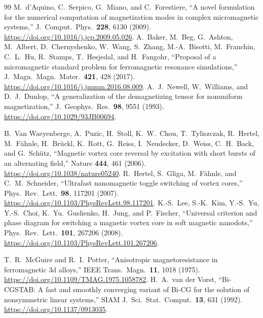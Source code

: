 \documentclass{article}      %
\begin{document}
\begin{thebibliography}{99}
 M.\ d'Aquino, C.\ Serpico, G.\ Miano, and C.\ Forestiere, ``A novel
  formulation for the numerical computation of magnetization modes in complex micromagnetic
  systems,'' J.\ Comput.\ Phys.\ \textbf{228}, 6130 (2009).
  \url{https://doi.org/10.1016/j.jcp.2009.05.026}.
 A.\ Baker, M.\ Beg, G.\ Ashton, M.\ Albert, D.\ Chernyshenko, W.\ Wang,
  S.\ Zhang, M.-A.\ Bisotti, M.\ Franchin, C.\ L.\ Hu, R.\ Stamps, T.\ Hesjedal, and H.\ Fangohr,
  ``Proposal of a micromagnetic standard problem for ferromagnetic resonance simulations,''
  J.\ Magn.\ Magn.\ Mater.\ \textbf{421}, 428 (2017).
  \url{https://doi.org/10.1016/j.jmmm.2016.08.009}.
 A.\ J.\ Newell, W.\ Williams, and D.\ J.\ Dunlop, ``A generalization of the
  demagnetizing tensor for nonuniform magnetization,'' J.\ Geophys.\ Res.\ \textbf{98}, 9551
  (1993). \url{https://doi.org/10.1029/93JB00694}.

 B.\ Van Waeyenberge, A.\ Puzic, H.\ Stoll,
  K.\ W.\ Chou, T.\ Tyliszczak, R.\ Hertel, M.\ F\"ahnle, H.\ Br\"uckl,
  K.\ Rott, G.\ Reiss, I.\ Neudecker, D.\ Weiss, C.\ H.\ Back, and G.\ Sch\"utz,
  ``Magnetic vortex core reversal by excitation with short bursts of an
  alternating field,'' Nature \textbf{444}, 461 (2006).
  \url{https://doi.org/10.1038/nature05240}.
 R.\ Hertel, S.\ Gliga, M.\ F\"ahnle, and C.\ M.\ Schneider,
  ``Ultrafast nanomagnetic toggle switching of vortex cores,'' Phys.\ Rev.\ Lett.\
  \textbf{98}, 117201 (2007).
  \url{https://doi.org/10.1103/PhysRevLett.98.117201}.
 K.-S.\ Lee, S.-K.\ Kim, Y.-S.\ Yu, Y.-S.\ Choi,
  K.\ Yu.\ Guslienko, H.\ Jung, and P.\ Fischer, ``Universal criterion and phase
  diagram for switching a magnetic vortex core in soft magnetic nanodots,''
  Phys.\ Rev.\ Lett.\ \textbf{101}, 267206 (2008).
  \url{https://doi.org/10.1103/PhysRevLett.101.267206}.

 T.\ R.\ McGuire and R.\ I.\ Potter, ``Anisotropic
  magnetoresistance in ferromagnetic 3d alloys,'' IEEE Trans.\ Magn.\
  \textbf{11}, 1018 (1975). \url{https://doi.org/10.1109/TMAG.1975.1058782}.
\bibitem{vandervorst1992} H.\ A.\ van der Vorst, ``Bi-CGSTAB: A fast and smoothly
  converging variant of Bi-CG for the solution of nonsymmetric linear systems,''
  SIAM J.\ Sci.\ Stat.\ Comput.\ \textbf{13}, 631 (1992).
  \url{https://doi.org/10.1137/0913035}.

\end{thebibliography}
\end{document}

